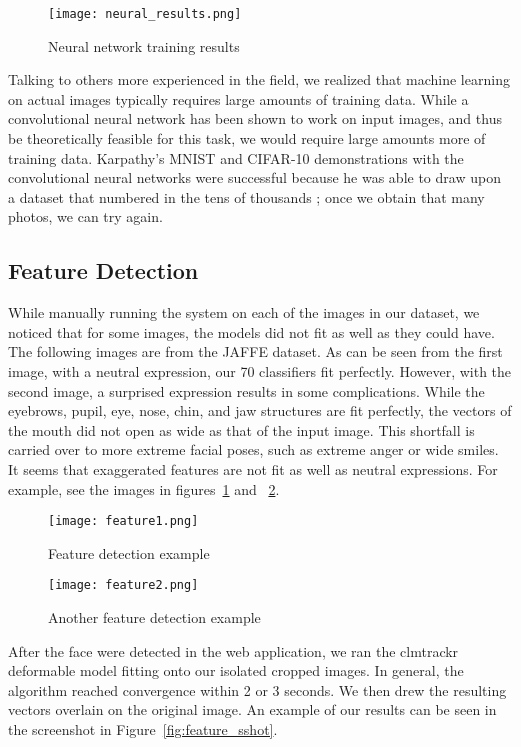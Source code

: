 \documentclass[10pt,twocolumn,letterpaper]{article}
\begin{document}
\begin{figure}
\centering
\texttt{[image: neural\_results.png]}
\caption{Neural network training results}
\end{figure}

Talking to others more experienced in the field, we realized that machine learning on actual images typically requires large amounts of training data. While a convolutional neural network has been shown to work on input images, and thus be theoretically feasible for this task, we would require large amounts more of training data. Karpathy's MNIST and CIFAR-10 demonstrations with the convolutional neural networks were successful because he was able to draw upon a dataset that numbered in the tens of thousands \cite{Karpathy2}; once we obtain that many photos, we can try again.

\subsection{Feature Detection}

While manually running the system on each of the images in our dataset, we noticed that for some images, the models did not fit as well as they could have. The following images are from the JAFFE dataset. As can be seen from the first image, with a neutral expression, our 70 classifiers fit perfectly. However, with the second image, a surprised expression results in some complications. While the eyebrows, pupil, eye, nose, chin, and jaw structures are fit perfectly, the vectors of the mouth did not open as wide as that of the input image. This shortfall is carried over to more extreme facial poses, such as extreme anger or wide smiles. It seems that exaggerated features are not fit as well as neutral expressions. For example, see the images in figures~\ref{fig:feature1} and ~\ref{fig:feature2}.

\begin{figure}
\centering
\texttt{[image: feature1.png]}
\caption{Feature detection example\label{fig:feature1}}
\end{figure}

\begin{figure}
\centering
\texttt{[image: feature2.png]}
\caption{Another feature detection example\label{fig:feature2}}
\end{figure}

After the face were detected in the web application, we ran the clmtrackr deformable model fitting onto our isolated cropped images. In general, the algorithm reached convergence within 2 or 3 seconds. We then drew the resulting vectors overlain on the original image. An example of our results can be seen in the screenshot in Figure~\ref{fig:feature_sshot}.
\end{document}
